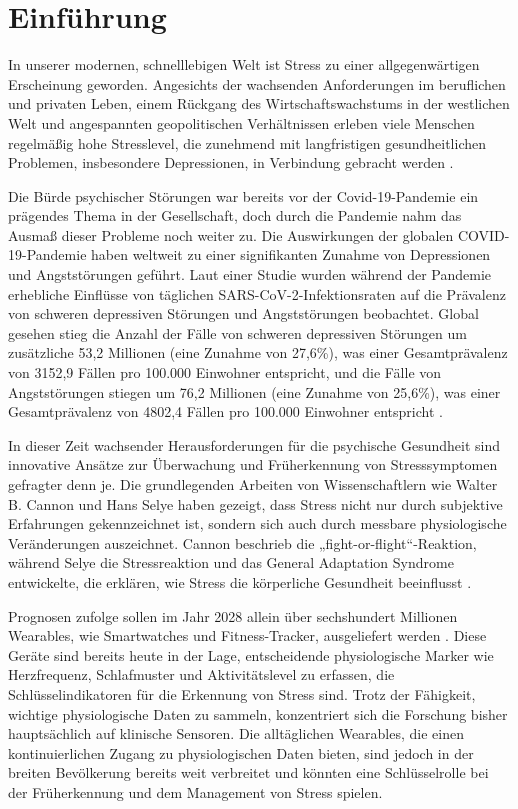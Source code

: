 \section{Einführung}

In unserer modernen, schnelllebigen Welt ist Stress zu einer allgegenwärtigen Erscheinung geworden. Angesichts der wachsenden Anforderungen im beruflichen und privaten Leben, einem Rückgang des Wirtschaftswachstums in der westlichen Welt und angespannten geopolitischen Verhältnissen erleben viele Menschen regelmäßig hohe Stresslevel, die zunehmend mit langfristigen gesundheitlichen Problemen, insbesondere Depressionen, in Verbindung gebracht werden \cite{Wang2008} \cite{Wang2001}.

Die Bürde psychischer Störungen war bereits vor der Covid-19-Pandemie ein prägendes Thema in der Gesellschaft, doch durch die Pandemie nahm das Ausmaß dieser Probleme noch weiter zu. Die Auswirkungen der globalen COVID-19-Pandemie haben weltweit zu einer signifikanten Zunahme von Depressionen und Angststörungen geführt. Laut einer Studie wurden während der Pandemie erhebliche Einflüsse von täglichen SARS-CoV-2-Infektionsraten auf die Prävalenz von schweren depressiven Störungen und Angststörungen beobachtet. Global gesehen stieg die Anzahl der Fälle von schweren depressiven Störungen um zusätzliche 53,2 Millionen (eine Zunahme von 27,6\%), was einer Gesamtprävalenz von 3152,9 Fällen pro 100.000 Einwohner entspricht, und die Fälle von Angststörungen stiegen um 76,2 Millionen (eine Zunahme von 25,6\%), was einer Gesamtprävalenz von 4802,4 Fällen pro 100.000 Einwohner entspricht \cite{Santomauro2021}.

In dieser Zeit wachsender Herausforderungen für die psychische Gesundheit sind innovative Ansätze zur Überwachung und Früherkennung von Stresssymptomen gefragter denn je. Die grundlegenden Arbeiten von Wissenschaftlern wie Walter B. Cannon und Hans Selye haben gezeigt, dass Stress nicht nur durch subjektive Erfahrungen gekennzeichnet ist, sondern sich auch durch messbare physiologische Veränderungen auszeichnet. Cannon beschrieb die „fight-or-flight“-Reaktion, während Selye die Stressreaktion und das General Adaptation Syndrome entwickelte, die erklären, wie Stress die körperliche Gesundheit beeinflusst \cite{Cannon1915} \cite{Selye1936}.

Prognosen zufolge sollen im Jahr 2028 allein über sechshundert Millionen Wearables, wie Smartwatches und Fitness-Tracker, ausgeliefert werden \cite{IDC2023}. Diese Geräte sind bereits heute in der Lage, entscheidende physiologische Marker wie Herzfrequenz, Schlafmuster und Aktivitätslevel zu erfassen, die Schlüsselindikatoren für die Erkennung von Stress sind. Trotz der Fähigkeit, wichtige physiologische Daten zu sammeln, konzentriert sich die Forschung bisher hauptsächlich auf klinische Sensoren. Die alltäglichen Wearables, die einen kontinuierlichen Zugang zu physiologischen Daten bieten, sind jedoch in der breiten Bevölkerung bereits weit verbreitet und könnten eine Schlüsselrolle bei der Früherkennung und dem Management von Stress spielen.

